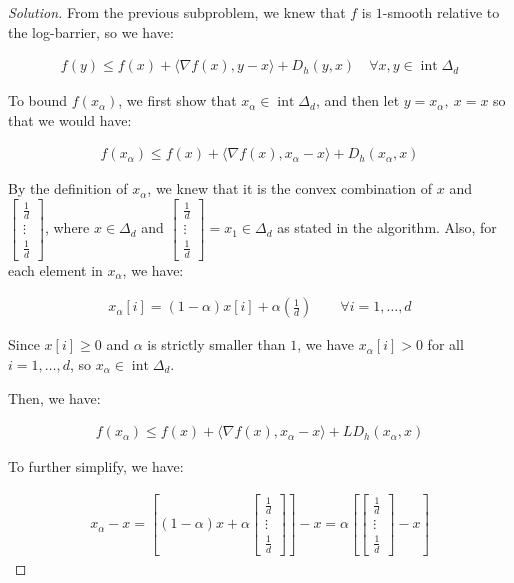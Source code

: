 \documentclass{article}
\newenvironment{solution}
  {\renewcommand\qedsymbol{$\blacksquare$}\begin{proof}[Solution]}
  {\end{proof}}
\DeclareMathOperator{\interior}{int}
\begin{document}
\begin{solution}
From the previous subproblem, we knew that $f$ is $1$-smooth relative to the log-barrier, so we have:

\begin{align*}
    f(y) \leq f(x) + \langle \nabla f(x), y - x \rangle + D_h(y, x) \quad \forall x, y \in \interior \Delta_d
\end{align*}

To bound $f(x_\alpha)$, we first show that $x_\alpha \in \interior \Delta_d$, 
and then let $y = x_\alpha, \ x = x$ so that we would have:

\begin{align*}
    f(x_\alpha) \leq f(x) + \langle \nabla f(x), x_\alpha - x \rangle + D_h(x_\alpha, x)
\end{align*}

By the definition of $x_\alpha$, we knew that it is the convex combination of $x$ and $\begin{bmatrix}
    \frac{1}{d} \\
    \vdots \\
    \frac{1}{d}
\end{bmatrix}$, 
where $x \in \Delta_d$ and $\begin{bmatrix}
    \frac{1}{d} \\
    \vdots \\
    \frac{1}{d}
\end{bmatrix} = x_1 \in \Delta_d$ as stated in the algorithm.
\bigskip
Also, for each element in $x_\alpha$, we have:

\begin{align*}
    x_\alpha[i] = (1 - \alpha) x[i] + \alpha \left( \frac{1}{d} \right) \qquad \forall i = 1, \dots, d
\end{align*}

Since $x[i] \geq 0$ and $\alpha$ is strictly smaller than $1$,
we have $x_\alpha[i] > 0$ for all $i = 1, \dots, d$,
so $x_\alpha \in \interior \Delta_d$.
\bigskip

Then, we have:

\begin{align*}
    f(x_\alpha) \leq f(x) + \langle \nabla f(x), x_\alpha - x \rangle + L D_h(x_\alpha, x)
\end{align*}

To further simplify, we have:

\begin{align*}
    x_\alpha - x 
    = \left[ (1 - \alpha) x + \alpha 
    \begin{bmatrix}
        \frac{1}{d} \\
        \vdots \\
        \frac{1}{d}
    \end{bmatrix}
    \right] - x = \alpha \left[ \begin{bmatrix}
    \frac{1}{d} \\
    \vdots \\
    \frac{1}{d} \end{bmatrix} - x \right]
\end{align*}


\end{solution}
\end{document}
